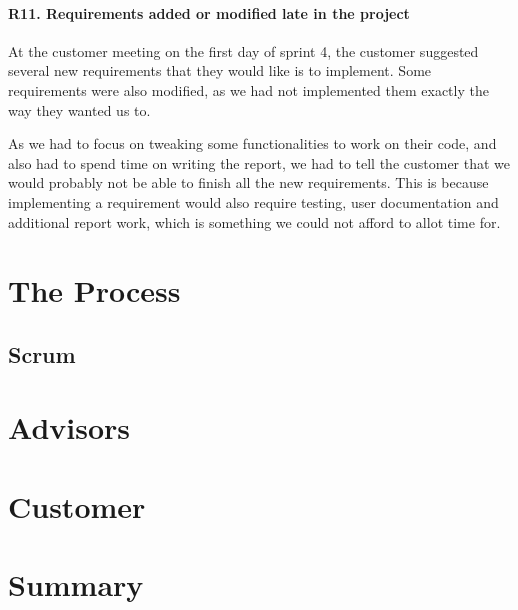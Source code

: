 \paragraph{R11. Requirements added or modified late in the project}
At the customer meeting on the first day of sprint 4, the customer suggested several new requirements that they would like is to implement. Some requirements were also modified, as we had not implemented them exactly the way they wanted us to.

As we had to focus on tweaking some functionalities to work on their code, and also had to spend time on writing the report, we had to tell the customer that we would probably not be able to finish all the new requirements. This is because implementing a requirement would also require testing, user documentation and additional report work, which is something we could not afford to allot time for.


\section{The Process}
\subsection{Scrum}


\section{Advisors}

\section{Customer}

\section{Summary}

